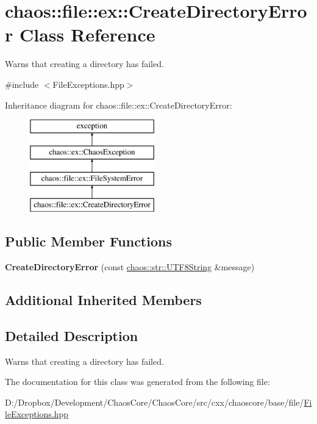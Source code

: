 \hypertarget{classchaos_1_1file_1_1ex_1_1_create_directory_error}{}\section{chaos\+:\+:file\+:\+:ex\+:\+:Create\+Directory\+Error Class Reference}
\label{classchaos_1_1file_1_1ex_1_1_create_directory_error}


Warns that creating a directory has failed.  




{\ttfamily \#include $<$File\+Exceptions.\+hpp$>$}

Inheritance diagram for chaos\+:\+:file\+:\+:ex\+:\+:Create\+Directory\+Error\+:\begin{figure}[H]
\begin{center}
\leavevmode
\includegraphics[height=4.000000cm]{classchaos_1_1file_1_1ex_1_1_create_directory_error}
\end{center}
\end{figure}
\subsection*{Public Member Functions}
\begin{DoxyCompactItemize}
\item 
\hypertarget{classchaos_1_1file_1_1ex_1_1_create_directory_error_a6b71f6913e728ed78a88844a1b5d1c25}{}{\bfseries Create\+Directory\+Error} (const \hyperlink{classchaos_1_1str_1_1_u_t_f8_string}{chaos\+::str\+::\+U\+T\+F8\+String} \&message)\label{classchaos_1_1file_1_1ex_1_1_create_directory_error_a6b71f6913e728ed78a88844a1b5d1c25}

\end{DoxyCompactItemize}
\subsection*{Additional Inherited Members}


\subsection{Detailed Description}
Warns that creating a directory has failed. 

The documentation for this class was generated from the following file\+:\begin{DoxyCompactItemize}
\item 
D\+:/\+Dropbox/\+Development/\+Chaos\+Core/\+Chaos\+Core/src/cxx/chaoscore/base/file/\hyperlink{_file_exceptions_8hpp}{File\+Exceptions.\+hpp}\end{DoxyCompactItemize}
